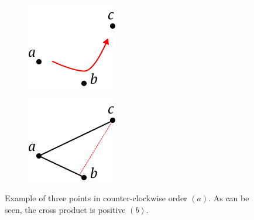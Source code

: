 \documentclass{article}
\begin{document}
\begin{figure}[h]
    \centering
    \begin{subfigure}[b]{.2\linewidth}
        \includegraphics[width=\textwidth]{intro/ccw_test_a.png}
        \caption{\label{fig:ccw_test_a}}
    \end{subfigure}
    \hspace{14mm}
    \begin{subfigure}[b]{.2\linewidth}
        \includegraphics[width=\textwidth]{intro/ccw_test_b.png}
        \caption{\label{fig:ccw_test_b}}
    \end{subfigure}
    
    \caption{\label{fig:ccw_test}Example of three points in counter-clockwise order $(a)$. As can be seen, the cross product is positive $(b)$.}
\end{figure}
\end{document}
